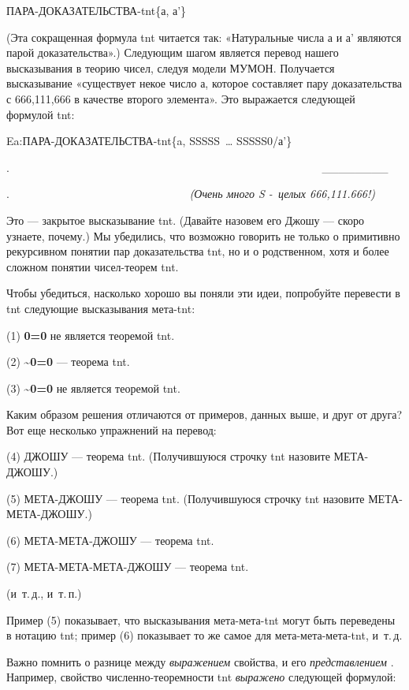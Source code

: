 \documentclass[../main.tex]{subfiles}
\begin{document}
ПАРА-ДОКАЗАТЕЛЬСТВА-\acs{tnt}\{а, а'\}

(Эта сокращенная формула \acs{tnt} читается так: «Натуральные числа а и а' являются парой доказательства».) Следующим шагом является перевод нашего высказывания в теорию чисел, следуя модели МУМОН. Получается высказывание «существует некое число а, которое составляет пару доказательства с 666,111,666 в качестве второго элемента». Это выражается следующей формулой \acs{tnt}:

Ea:ПАРА-ДОКАЗАТЕЛЬСТВА-\acs{tnt}\{a, SSSSS~\ldots{} SSSSS0/а'\}

.~~~~~~~~~~~~~~~~~~~~~~~~~~~~~~~~~~~~~~~~~~~~~~~~~~~~~~~~ \textbar\_\_\_\_\_\_\_\_\textbar~

.~~~~~~~~~~~~~~~~~~~~~~~~~~~~~~~~ \emph{(Очень много S -~целых 666,111.666!)}

Это --- закрытое высказывание \acs{tnt}\@. (Давайте назовем его Джошу --- скоро узнаете, почему.) Мы убедились, что возможно говорить не только о примитивно рекурсивном понятии пар доказательства \acs{tnt}, но и о родственном, хотя и более сложном понятии чисел-теорем \acs{tnt}.

Чтобы убедиться, насколько хорошо вы поняли эти идеи, попробуйте перевести в \acs{tnt} следующие высказывания мета-\acs{tnt}:

(1) \textbf{0=0} не является теоремой \acs{tnt}.

(2) \textbf{\textasciitilde0=0} --- теорема \acs{tnt}.

(3) \textbf{\textasciitilde0=0} не является теоремой \acs{tnt}.

Каким образом решения отличаются от примеров, данных выше, и друг от друга? Вот еще несколько упражнений на перевод:

(4) ДЖОШУ --- теорема \acs{tnt}\@. (Получившуюся строчку \acs{tnt} назовите МЕТА-ДЖОШУ.)

(5) МЕТА-ДЖОШУ --- теорема \acs{tnt}\@. (Получившуюся строчку \acs{tnt} назовите МЕТА-МЕТА-ДЖОШУ.)

(6) МЕТА-МЕТА-ДЖОШУ --- теорема \acs{tnt}.

(7) МЕТА-МЕТА-МЕТА-ДЖОШУ --- теорема \acs{tnt}.

(и~т.\,д., и~т.\,п.)

Пример (5) показывает, что высказывания мета-мета-\acs{tnt} могут быть переведены в нотацию \acs{tnt}; пример (6) показывает то же самое для мета-мета-мета-\acs{tnt}, и~т.\,д.

Важно помнить о разнице между \emph{выражением} свойства, и его \emph{представлением} . Например, свойство численно-теоремности \acs{tnt} \emph{выражено} следующей формулой:
\end{document}
